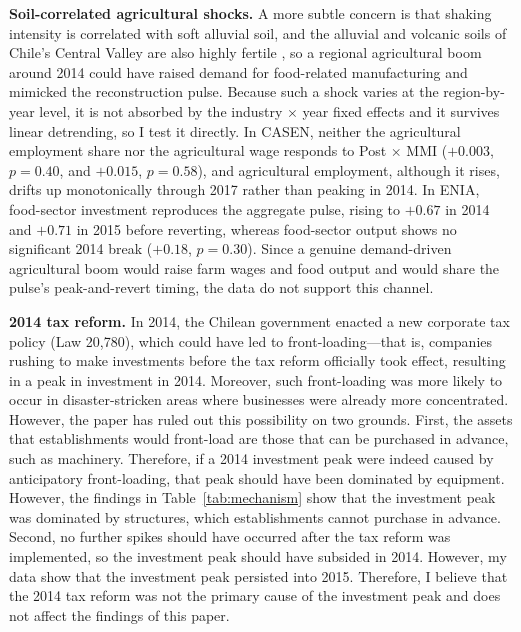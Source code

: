 \documentclass[12pt]{article}
\begin{document}
\textbf{Soil-correlated agricultural shocks.} A more subtle concern is that shaking intensity is
correlated with soft alluvial soil, and the alluvial and volcanic soils of Chile's Central Valley
are also highly fertile \citep{casanova2013}, so a regional agricultural boom around 2014 could
have raised demand for food-related manufacturing and mimicked the reconstruction pulse. Because
such a shock varies at the region-by-year level, it is not absorbed by the industry $\times$ year
fixed effects and it survives linear detrending, so I test it directly. In CASEN, neither the
agricultural employment share nor the agricultural wage responds to Post $\times$ MMI ($+0.003$,
$p=0.40$, and $+0.015$, $p=0.58$), and agricultural employment, although it rises, drifts up
monotonically through 2017 rather than peaking in 2014. In ENIA, food-sector investment reproduces
the aggregate pulse, rising to $+0.67$ in 2014 and $+0.71$ in 2015 before reverting, whereas
food-sector output shows no significant 2014 break ($+0.18$, $p=0.30$). Since a genuine
demand-driven agricultural boom would raise farm wages and food output and would share the pulse's
peak-and-revert timing, the data do not support this channel.

\textbf{2014 tax reform.} In 2014, the Chilean government enacted a new corporate tax policy (Law 20,780),
which could have led to front-loading---that is, companies rushing to make investments before the tax
reform officially took effect, resulting in a peak in investment in 2014. Moreover, such front-loading was
more likely to occur in disaster-stricken areas where businesses were already more concentrated. However,
the paper has ruled out this possibility on two grounds. First, the assets that establishments would
front-load are those that can be purchased in advance, such as machinery. Therefore, if a 2014 investment
peak were indeed caused by anticipatory front-loading, that peak should have been dominated by equipment.
However, the findings in Table~\ref{tab:mechanism} show that the investment peak was dominated by
structures, which establishments cannot purchase in advance. Second, no further spikes should have
occurred after the tax reform was implemented, so the investment peak should have subsided in 2014.
However, my data show that the investment peak persisted into 2015. Therefore, I believe that the 2014 tax
reform was not the primary cause of the investment peak and does not affect the findings of this paper.
\end{document}
